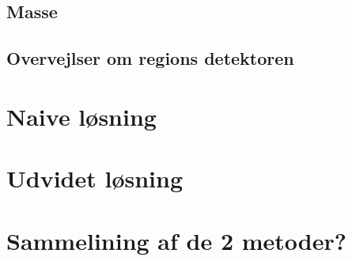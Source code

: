 {\subsection{Masse}

\clearpage

\subsection{Overvejlser om regions detektoren}



\section{Naive løsning}

\clearpage

\section{Udvidet løsning}

\clearpage

\section{Sammelining af de 2 metoder?}

\clearpage


}

